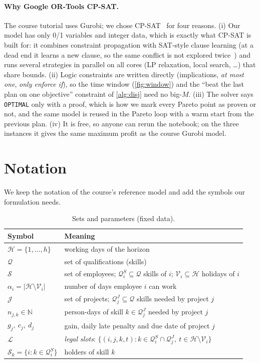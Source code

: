 \documentclass[10pt,a4paper]{article}
\theoremstyle{plain}
\theoremstyle{definition}
\theoremstyle{remark}
\newcommand{\Hor}{\mathcal{H}}
\newcommand{\Q}{\mathcal{Q}}
\newcommand{\Sset}{\mathcal{S}}
\newcommand{\J}{\mathcal{J}}
\newcommand{\Leg}{\mathcal{L}}
\newcommand{\QS}[1]{\mathcal{Q}^{S}_{#1}}
\newcommand{\QJ}[1]{\mathcal{Q}^{J}_{#1}}
\newcommand{\V}[1]{\mathcal{V}_{#1}}
\newcommand{\avail}[1]{\alpha_{#1}}
\begin{document}
\paragraph{Why Google OR-Tools CP-SAT.} The course tutorial uses Gurobi; we chose CP-SAT~\cite{ortools}
for four reasons. (i) Our model has only 0/1 variables and integer data, which is exactly what CP-SAT is
built for: it combines constraint propagation with SAT-style clause learning (at a dead end it learns
a new clause, so the same conflict is not explored twice~\cite{stuckey}) and runs several strategies in parallel on
all cores (LP relaxation, local search, \dots) that share bounds. (ii) Logic constraints are written
directly (implications, \emph{at most one}, \emph{only enforce if}), so the time window
(\cref{fig:window}) and the ``beat the last plan on one objective'' constraint of \cref{alg:disj}
need no big-$M$. (iii) The solver says \texttt{OPTIMAL} only with a proof, which is how we mark every
Pareto point as proven or not, and the same model is reused in the Pareto loop with a warm start from
the previous plan. (iv) It is free, so anyone can rerun the notebook; on the three instances it gives
the same maximum profit as the course Gurobi model.

\section{Notation}

We keep the notation of the course's reference model and add the symbols our formulation needs.

\begin{table}[!htbp]
\centering\small
\begin{tabularx}{\linewidth}{@{}l X@{}}
\toprule
\textbf{Symbol} & \textbf{Meaning} \\
\midrule
$\Hor=\{1,\dots,h\}$ & working days of the horizon \\
$\Q$ & set of qualifications (skills) \\
$\Sset$ & set of employees; $\QS{i}\subseteq\Q$ skills of $i$; $\V{i}\subseteq\Hor$ holidays of $i$ \\
$\avail{i}=|\Hor\setminus\V{i}|$ & number of days employee $i$ can work \\
$\J$ & set of projects; $\QJ{j}\subseteq\Q$ skills needed by project $j$ \\
$n_{j,k}\in\mathbb{N}$ & person-days of skill $k\in\QJ{j}$ needed by project $j$ \\
$g_j,\ c_j,\ d_j$ & gain, daily late penalty and due date of project $j$ \\
$\Leg$ & \emph{legal slots}: $\{(i,j,k,t) : k\in\QS{i}\cap\QJ{j},\ t\in\Hor\setminus\V{i}\}$ \\
$\Sset_k=\{i: k\in\QS{i}\}$ & holders of skill $k$ \\
\bottomrule
\end{tabularx}
\caption{Sets and parameters (fixed data).}
\label{tab:notation}
\end{table}
\end{document}
